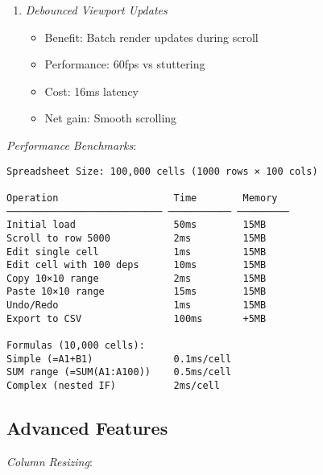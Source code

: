 \documentclass[11pt]{article}
\begin{document}
\begin{enumerate}
\item \emph{Debounced Viewport Updates}
\begin{itemize}
\item Benefit: Batch render updates during scroll
\item Performance: 60fps vs stuttering
\item Cost: 16ms latency
\item Net gain: Smooth scrolling
\end{itemize}
\end{enumerate}

\emph{Performance Benchmarks}:

\begin{verbatim}
Spreadsheet Size: 100,000 cells (1000 rows × 100 cols)

Operation                    Time        Memory
─────────────────────────── ─────────── ─────────
Initial load                 50ms        15MB
Scroll to row 5000           2ms         15MB
Edit single cell             1ms         15MB
Edit cell with 100 deps      10ms        15MB
Copy 10×10 range             2ms         15MB
Paste 10×10 range            15ms        15MB
Undo/Redo                    1ms         15MB
Export to CSV                100ms       +5MB

Formulas (10,000 cells):
Simple (=A1+B1)              0.1ms/cell
SUM range (=SUM(A1:A100))    0.5ms/cell
Complex (nested IF)          2ms/cell
\end{verbatim}
\subsection{Advanced Features}
\label{sec:org4ea6b5b}

\emph{Column Resizing}:
\end{document}
